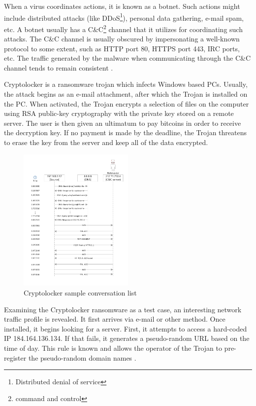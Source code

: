 \documentclass[9pt,journal,compsoc]{IEEEtran}
\begin{document}
When a virus coordinates actions, it is known as a botnet. Such actions might include distributed attacks (like DDoS\footnote{Distributed denial of service}), personal data gathering, e-mail spam, etc. A botnet usually has a C\&C\footnote{command and control} channel that it utilizes for coordinating such attacks.
The C\&C channel is usually obscured by impersonating a well-known protocol to some extent, such as HTTP port 80, HTTPS port 443, IRC ports, etc.
The traffic generated by the malware when communicating through the C\&C channel tends to remain consistent \cite{Vil12}.

Cryptolocker is a ransomware trojan which infects Windows based PCs. Usually, the attack begins as an e-mail attachment, after which the Trojan is installed on the PC. When activated, the Trojan encrypts a selection of files on the computer using RSA public-key cryptography with the private key stored on a remote server. The user is then given an ultimatum to pay bitcoins in order to receive the decryption key. If no payment is made by the deadline, the Trojan threatens to erase the key from the server and keep all of the data encrypted.

\begin{figure}[!ht]
 \centering
 \includegraphics[width=0.5\textwidth]{fig1.pdf}
 \caption{Cryptolocker sample conversation list\label{fig:cryptolockerconv}}
\end{figure} 

Examining the Cryptolocker ransomware as a test case, an interesting network traffic profile is revealed. It first arrives via e-mail or other method. Once installed, it begins looking for a server. First, it attempts to access a hard-coded IP 184.164.136.134. If that fails, it generates a pseudo-random URL based on the time of day. This rule is known and allows the operator of the Trojan to pre-register the pseudo-random domain names \cite{EMS13}.
\end{document}

